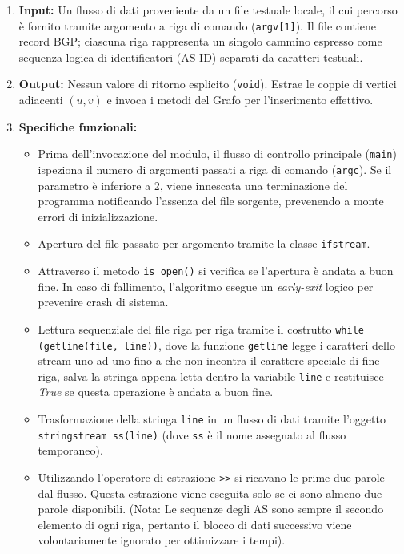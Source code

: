 \documentclass[12pt, a4paper]{article}
\begin{document}
\begin{enumerate}
    \item \textbf{Input:} Un flusso di dati proveniente da un file testuale locale, il cui percorso è fornito tramite argomento a riga di comando (\texttt{argv[1]}). Il file contiene record BGP; ciascuna riga rappresenta un singolo cammino espresso come sequenza logica di identificatori (AS ID) separati da caratteri testuali.
    \item \textbf{Output:} Nessun valore di ritorno esplicito (\texttt{void}). Estrae le coppie di vertici adiacenti $(u, v)$ e invoca i metodi del Grafo per l'inserimento effettivo.
    \item \textbf{Specifiche funzionali:}
    \begin{itemize}
        \item[-] Prima dell'invocazione del modulo, il flusso di controllo principale (\texttt{main}) ispeziona il numero di argomenti passati a riga di comando (\texttt{argc}). Se il parametro è inferiore a 2, viene innescata una terminazione del programma notificando l'assenza del file sorgente, prevenendo a monte errori di inizializzazione.
        \item[-] Apertura del file passato per argomento tramite la classe \texttt{ifstream}.
        \item[-] Attraverso il metodo \texttt{is\_open()} si verifica se l'apertura è andata a buon fine. In caso di fallimento, l'algoritmo esegue un \textit{early-exit} logico per prevenire crash di sistema.
        \item[-] Lettura sequenziale del file riga per riga tramite il costrutto \texttt{while (getline(file, line))}, dove la funzione \texttt{getline} legge i caratteri dello stream uno ad uno fino a che non incontra il carattere speciale di fine riga, salva la stringa appena letta dentro la variabile \texttt{line} e restituisce \textit{True} se questa operazione è andata a buon fine.
        \item[-] Trasformazione della stringa \texttt{line} in un flusso di dati tramite l'oggetto \texttt{stringstream ss(line)} (dove \texttt{ss} è il nome assegnato al flusso temporaneo).
        \item[-] Utilizzando l'operatore di estrazione \texttt{>>} si ricavano le prime due parole dal flusso. Questa estrazione viene eseguita solo se ci sono almeno due parole disponibili. (Nota: Le sequenze degli AS sono sempre il secondo elemento di ogni riga, pertanto il blocco di dati successivo viene volontariamente ignorato per ottimizzare i tempi). 

\end{itemize}
\end{enumerate}
\end{document}
